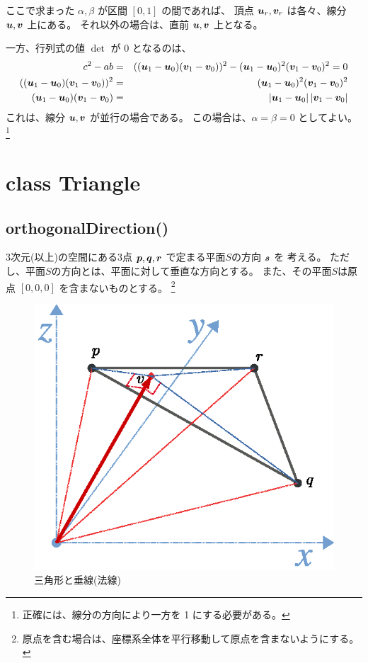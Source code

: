 \documentclass[11pt,a4j]{jarticle}
\begin{document}
ここで求まった $\alpha, \beta$ が区間 $[0,1]$ の間であれば、
頂点 ${\bm{u}}_r, {\bm{v}}_r$ は各々、線分 ${\bm{u}}, {\bm{v}}$ 上にある。
それ以外の場合は、直前 ${\bm{u}}, {\bm{v}}$ 上となる。

一方、行列式の値 $\det$ が 0 となるのは、
  \begin{eqnarray}
    c^2 - ab
      & = &
        (({\bm{u}}_1 - {\bm{u}}_0) ({\bm{v}}_1 - {\bm{v}}_0))^2 -
        ({\bm{u}}_1 - {\bm{u}}_0)^2 ({\bm{v}}_1 - {\bm{v}}_0)^2
      = 0
  \\
    (({\bm{u}}_1 - {\bm{u}}_0) ({\bm{v}}_1 - {\bm{v}}_0))^2
      & = &
        ({\bm{u}}_1 - {\bm{u}}_0)^2 ({\bm{v}}_1 - {\bm{v}}_0)^2
  \\
    ({\bm{u}}_1 - {\bm{u}}_0) ({\bm{v}}_1 - {\bm{v}}_0)
      & = &
        \left| {\bm{u}}_1 - {\bm{u}}_0 \right| \left| {\bm{v}}_1 - {\bm{v}}_0 \right|
  \end{eqnarray}
これは、線分 ${\bm{u}}, {\bm{v}}$ が並行の場合である。
この場合は、$\alpha = \beta = 0$ としてよい。
\footnote{正確には、線分の方向により一方を 1 にする必要がある。}



\section{class Triangle}

\subsection{orthogonalDirection()}
3次元(以上)の空間にある3点 ${\bm{p}}, {\bm{q}}, {\bm{r}}$ で定まる平面$S$の方向 ${\bm{s}}$ を
考える。
ただし、平面$S$の方向とは、平面に対して垂直な方向とする。
また、その平面$S$は原点 $[0,0,0]$ を含まないものとする。
  \footnote{原点を含む場合は、座標系全体を平行移動して原点を含まないようにする。}

\begin{figure}[h]
  \centering
  \includegraphics[width=.5\linewidth]{Fig/figure-02.eps}
  \caption{三角形と垂線(法線)}
  \label{fig:Fig/figure-02.eps}
\end{figure}
\end{document}
